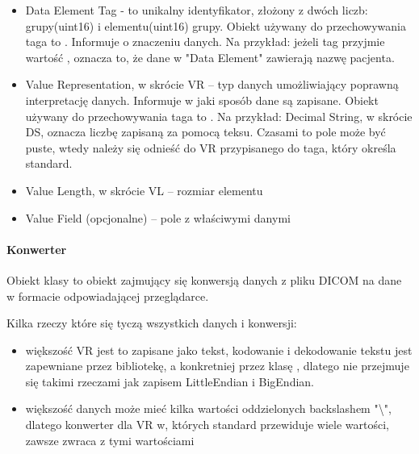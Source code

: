 \begin{itemize}
    \item Data Element Tag - to unikalny identyfikator, złożony z dwóch liczb: grupy(uint16) i elementu(uint16) grupy.
    Obiekt używany do przechowywania taga to .
    Informuje o znaczeniu danych.
    Na przykład: jeżeli tag przyjmie wartość , oznacza to, że dane w "Data Element" zawierają nazwę pacjenta.
    \item Value Representation, w skrócie VR – typ danych umożliwiający poprawną interpretację danych.
    Informuje w jaki sposób dane są zapisane.
    Obiekt używany do przechowywania taga to .
    Na przykład: Decimal String, w skrócie DS, oznacza liczbę zapisaną za pomocą teksu.
    Czasami to pole może być puste, wtedy należy się odnieść do VR przypisanego do taga, który określa standard.
    \item Value Length, w skrócie VL – rozmiar elementu
    \item Value Field (opcjonalne) – pole z właściwymi danymi
\end{itemize}

\paragraph{Konwerter}

Obiekt klasy  to obiekt zajmujący się konwersją danych z pliku DICOM na dane w formacie odpowiadającej przeglądarce.

Kilka rzeczy które się tyczą wszystkich danych i konwersji:
\begin{itemize}
    \item większość VR jest to zapisane jako tekst, kodowanie i dekodowanie tekstu jest zapewniane przez bibliotekę, a konkretniej przez klasę , dlatego nie przejmuje się takimi rzeczami jak zapisem LittleEndian i BigEndian.
    \item większość danych może mieć kilka wartości oddzielonych backslashem "\textbackslash", dlatego konwerter dla VR w, których standard przewiduje wiele wartości, zawsze zwraca  z tymi wartościami
\end{itemize}

